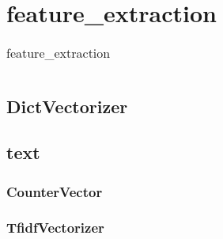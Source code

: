 \chapter{feature\_extraction}
\begin{table}
    \centering
    \caption{feature\_extraction}
    \begin{tabular}{lll}
        \hline
        \nameref{CounterVector} & \nameref{DictVectorizer} \nameref{TfidfVectorizer} \\
        \hline
    \end{tabular}
\end{table}
\section{DictVectorizer\label{DictVectorizer}}
\section{text}
\subsection{CounterVector\label{CounterVector}}
\subsection{TfidfVectorizer\label{TfidfVectorizer}}